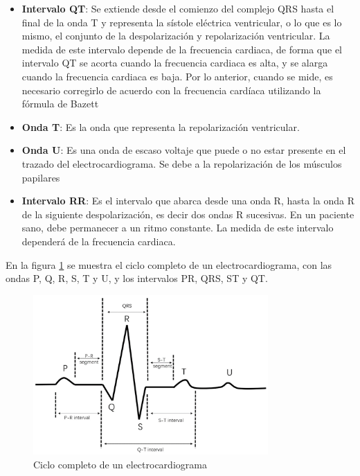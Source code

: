 \begin{itemize}
        \item \textbf{Intervalo QT}: Se extiende desde el comienzo del complejo QRS hasta el final de la onda T y representa la sístole eléctrica ventricular, o lo que es lo mismo, el conjunto de la despolarización y repolarización ventricular. La medida de este intervalo depende de la frecuencia cardiaca, de forma que el intervalo QT se acorta cuando la frecuencia cardiaca es alta, y se alarga cuando la frecuencia cardiaca es baja. Por lo anterior, cuando se mide, es necesario corregirlo de acuerdo con la frecuencia cardíaca utilizando la fórmula de Bazett
        \item \textbf{Onda T}: Es la onda que representa la repolarización ventricular.
        \item \textbf{Onda U}: Es una onda de escaso voltaje que puede o no estar presente en el trazado del electrocardiograma. Se debe a la repolarización de los músculos papilares
        \item \textbf{Intervalo RR}: Es el intervalo que abarca desde una onda R, hasta la onda R de la siguiente despolarización, es decir dos ondas R sucesivas. En un paciente sano, debe permanecer a un ritmo constante. La medida de este intervalo dependerá de la frecuencia cardiaca.
    \end{itemize}

    En la figura \ref{fig:ECG_ondas} se muestra el ciclo completo de un electrocardiograma, con las ondas P, Q, R, S, T y U, y los intervalos PR, QRS, ST y QT.

    \begin{figure}[H]
        \centering
        \includegraphics[width=0.8\textwidth]{img/Marco/ECG_ondas.png}
        \caption[Ciclo completo de un electrocardiograma]{Ciclo completo de un electrocardiograma\footnotemark}
        \label{fig:ECG_ondas}
    \end{figure}

